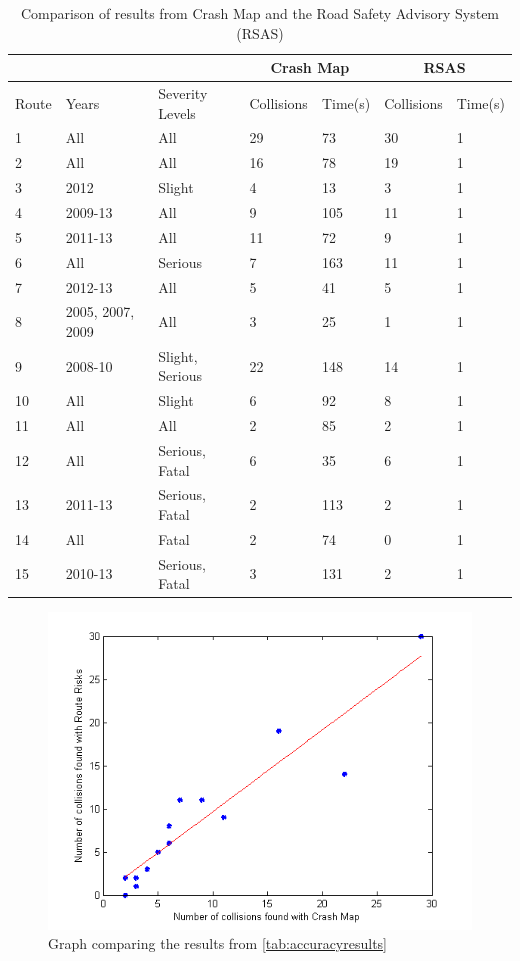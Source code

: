 \documentclass[authoryearcitations]{UoYCSproject}
\begin{document}
\begin{table}
	\center
	\caption{Comparison of results from Crash Map and the Road Safety Advisory System (RSAS)}
	\label{tab:accuracyresults}
	\begin{tabular}{| p{1cm} | p{2cm} | p{2.5cm} | p{1.7cm} | p{1.7cm} | p{1.7cm} | p{1.7cm} |}
	\hline
	\multicolumn{3}{|c|}{} & \multicolumn{2}{c|}{\textbf{Crash Map}} & \multicolumn{2}{c|}{\textbf{RSAS}}  \\ \hline
	Route & Years & Severity Levels & Collisions & Time(s) & Collisions & Time(s) \\ \hline
	1 & All & All & 29 & 73 & 30 & 1 \\ \hline
	2 & All & All &16 & 78 & 19 & 1 \\ \hline
	3 & 2012 & Slight & 4 & 13 & 3 & 1 \\ \hline
	4 & 2009-13 & All & 9 & 105 & 11 & 1 \\ \hline
	5 & 2011-13 & All & 11 & 72 & 9 & 1 \\ \hline
	6 & All & Serious & 7 & 163 & 11 & 1 \\ \hline
	7 & 2012-13 & All & 5 & 41 & 5 & 1 \\ \hline
	8 & 2005, 2007, 2009 & All & 3 & 25 & 1 & 1 \\ \hline
	9 & 2008-10 & Slight, Serious & 22 & 148 & 14 & 1 \\ \hline
	10 & All & Slight & 6 & 92 & 8 & 1 \\ \hline
	11 & All & All & 2 & 85 & 2 & 1 \\ \hline
	12 & All & Serious, Fatal & 6 & 35 & 6 & 1 \\ \hline
	13 & 2011-13 & Serious, Fatal & 2 & 113 & 2 & 1 \\ \hline
	14 & All & Fatal & 2 & 74 & 0 & 1 \\ \hline
	15 & 2010-13 & Serious, Fatal & 3 & 131 & 2 & 1 \\ \hline
	\end{tabular}
\end{table}

\begin{figure}
	\center
	\includegraphics[scale=1]{accuracycomparison}
	\caption{Graph comparing the results from \autoref{tab:accuracyresults}}
	\label{fig:graphaccuracy}
\end{figure}
\end{document}
